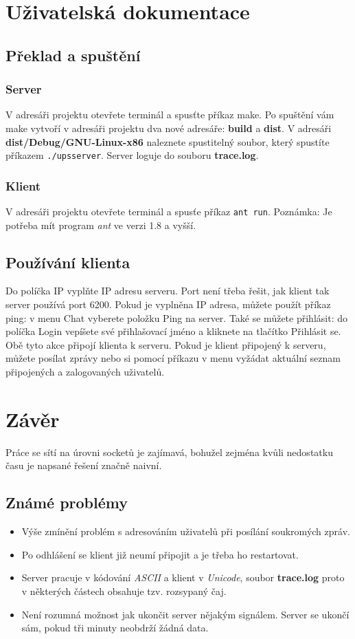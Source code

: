 \documentclass[11pt, titlepage]{article}
\begin{document}
\section{Uživatelská dokumentace}

\subsection{Překlad a spuštění}

\subsubsection{Server}
V adresáři projektu otevřete terminál a spusťte příkaz make. Po spuštění vám make vytvoří v adresáři projektu dva nové adresáře: \textbf{build} a \textbf{dist}. V adresáři \textbf{dist/Debug/GNU-Linux-x86} naleznete spustitelný soubor, který spustíte příkazem \texttt{./upsserver}. Server loguje do souboru \textbf{trace.log}.

\subsubsection{Klient}
V adresáři projektu otevřete terminál a spusťe příkaz \texttt{ant run}. Poznámka: Je potřeba mít program \textit{ant} ve verzi 1.8 a vyšší.

\subsection{Používání klienta}
Do políčka IP vyplňte IP adresu serveru. Port není třeba řešit, jak klient tak server používá port 6200. Pokud je vyplněna IP adresa, můžete použít příkaz ping: v menu Chat vyberete položku Ping na server. Také se můžete přihlásit: do políčka Login vepíšete své přihlašovací jméno a kliknete na tlačítko Přihlásit se. Obě tyto akce připojí klienta k serveru. Pokud je klient připojený k serveru, můžete posílat zprávy nebo si pomocí příkazu v menu vyžádat aktuální seznam připojených a zalogovaných uživatelů.

\section{Závěr}
Práce se sítí na úrovni socketů je zajímavá, bohužel zejména kvůli nedostatku času je napsané řešení značně naivní.

\subsection{Známé problémy}
\begin{itemize}
 \item Výše zmínění problém s adresováním uživatelů při posílání soukromých zpráv.
 \item Po odhlášení se klient již neumí připojit a je třeba ho restartovat.
 \item Server pracuje v kódování \textit{ASCII} a klient v \textit{Unicode}, soubor \textbf{trace.log} proto v některých částech obsahuje tzv. rozsypaný čaj.
 \item Není rozumná možnost jak ukončit server nějakým signálem. Server se ukončí sám, pokud tři minuty neobdrží žádná data.
\end{itemize}
\end{document}
